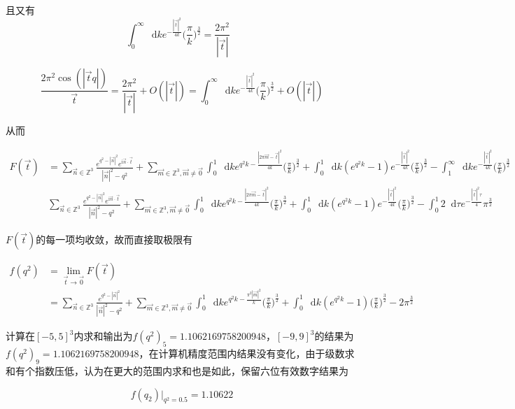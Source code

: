 \documentclass[UTF8]{ctexart}
\newcommand*{\dif}{\mathop{}\!\mathrm{d}}
\begin{document}
且又有
\begin{equation}\label{4-c-3}
    \int_0^\infty\dif ke^{-\frac{|\vec{t}|^2}{4k}}\Big(\frac{\pi}{k}\Big)^\frac{3}{2}=\frac{2\pi^2}{|\vec{t}|}
\begin{aligned}
\end{aligned}
\end{equation}

\begin{equation}\label{4-c-4}
    \frac{2\pi^2\cos(|\vec{t}q|)}{\vec{t}}=\frac{2\pi^2}{|\vec{t}|}+O(|\vec{t}|)=\int_0^\infty\dif ke^{-\frac{|\vec{t}|^2}{4k}}\Big(\frac{\pi}{k}\Big)^\frac{3}{2}+O(|\vec{t}|)
\end{equation}


从而

\begin{equation}\label{4-c-5}
    \begin{aligned}
    F(\vec{t})&=\sum_{\vec{n}\in\mathbb{Z}^3}\frac{e^{q^2-|\vec{n}|^2}e^{\mathrm{i}\vec{n}\cdot\vec{t}}}{|\vec{n}|^2-q^2}+\sum_{\vec{m}\in\mathbb{Z}^3,\vec{m}\neq\vec{0}}\int_0^1\dif k e^{q^2k-\frac{|2\pi\vec{m}-\vec{t}|^2}{4k}}\Big(\frac{\pi}{k}\Big)^\frac{3}{2}+\int_0^1\dif k(e^{q^2k}-1)e^{-\frac{|\vec{t}|^2}{4k}}\Big(\frac{\pi}{k}\Big)^\frac{3}{2}-\int_1^\infty\dif k e^{-\frac{|\vec{t}|^2}{4k}}\Big(\frac{\pi}{k}\Big)^\frac{3}{2}\\
    &\sum_{\vec{n}\in\mathbb{Z}^3}\frac{e^{q^2-|\vec{n}|^2}e^{\mathrm{i}\vec{n}\cdot\vec{t}}}{|\vec{n}|^2-q^2}+\sum_{\vec{m}\in\mathbb{Z}^3,\vec{m}\neq\vec{0}}\int_0^1\dif k e^{q^2k-\frac{|2\pi\vec{m}-\vec{t}|^2}{4k}}\Big(\frac{\pi}{k}\Big)^\frac{3}{2}+\int_0^1\dif k(e^{q^2k}-1)e^{-\frac{|\vec{t}|^2}{4k}}\Big(\frac{\pi}{k}\Big)^\frac{3}{2}-\int_0^1 2\dif \tau e^{-\frac{|\vec{t}|^2\tau}{4}}\pi^\frac{3}{2}
    \end{aligned}
\end{equation}

$F(\vec{t})$的每一项均收敛，故而直接取极限有

\begin{equation}\label{4-c-6}
    \begin{aligned}
    f(q^2)&=\lim_{\vec{t}\rightarrow\vec{0}}F(\vec{t})\\
    &=\sum_{\vec{n}\in\mathbb{Z}^3}\frac{e^{q^2-|\vec{n}|^2}}{|\vec{n}|^2-q^2}+\sum_{\vec{m}\in\mathbb{Z}^3,\vec{m}\neq\vec{0}}\int_0^1\dif k e^{q^2k-\frac{\pi^2|\vec{m}|^2}{k}}\Big(\frac{\pi}{k}\Big)^\frac{3}{2}+\int_0^1\dif k(e^{q^2k}-1)\Big(\frac{\pi}{k}\Big)^\frac{3}{2}-2\pi^\frac{3}{2}
    \end{aligned}
\end{equation}

计算在$[-5,5]^3$内求和输出为$f(q^2)_5=1.1062169758200948$，$[-9,9]^3$的结果为$f(q^2)_{9}=1.1062169758200948$，在计算机精度范围内结果没有变化，由于级数求和有个指数压低，认为在更大的范围内求和也是如此，保留六位有效数字结果为

$$f(q_2)|_{q^2=0.5}=1.10622$$
\end{document}
